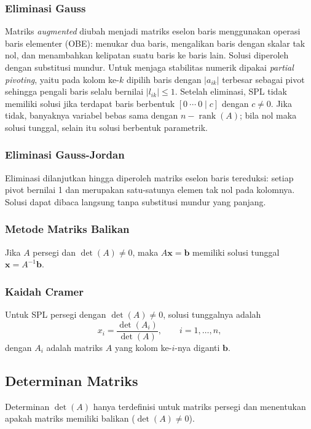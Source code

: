 \documentclass[12pt,a4paper]{article}
\newcommand{\mat}[1]{\mathbf{#1}}
\begin{document}
\subsubsection{Eliminasi Gauss}
Matriks \textit{augmented} diubah menjadi matriks eselon baris menggunakan operasi baris elementer (OBE): menukar dua baris, mengalikan baris dengan skalar tak nol, dan menambahkan kelipatan suatu baris ke baris lain. Solusi diperoleh dengan substitusi mundur. Untuk menjaga stabilitas numerik dipakai \textit{partial pivoting}, yaitu pada kolom ke-$k$ dipilih baris dengan $|a_{ik}|$ terbesar sebagai pivot sehingga pengali baris selalu bernilai $|l_{ik}|\le 1$.
Setelah eliminasi, SPL tidak memiliki solusi jika terdapat baris berbentuk $[0\ \cdots\ 0\mid c]$ dengan $c\neq 0$. Jika tidak, banyaknya variabel bebas sama dengan $n-\operatorname{rank}(A)$; bila nol maka solusi tunggal, selain itu solusi berbentuk parametrik.

\subsubsection{Eliminasi Gauss-Jordan}
Eliminasi dilanjutkan hingga diperoleh matriks eselon baris tereduksi: setiap pivot bernilai 1 dan merupakan satu-satunya elemen tak nol pada kolomnya. Solusi dapat dibaca langsung tanpa substitusi mundur yang panjang.

\subsubsection{Metode Matriks Balikan}
Jika $A$ persegi dan $\det(A)\neq0$, maka $A\mat{x}=\mat{b}$ memiliki solusi tunggal $\mat{x}=A^{-1}\mat{b}$.

\subsubsection{Kaidah Cramer}
Untuk SPL persegi dengan $\det(A)\neq 0$, solusi tunggalnya adalah
\begin{equation}
  x_i=\frac{\det(A_i)}{\det(A)},\qquad i=1,\dots,n,
\end{equation}
dengan $A_i$ adalah matriks $A$ yang kolom ke-$i$-nya diganti $\mat{b}$.

\subsection{Determinan Matriks}
Determinan $\det(A)$ hanya terdefinisi untuk matriks persegi dan menentukan apakah matriks memiliki balikan ($\det(A)\ne0$).
\end{document}
